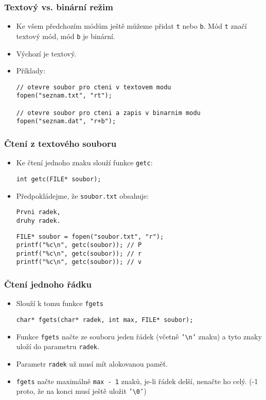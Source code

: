 \documentclass{beamer}
\newenvironment{itemizex}%
  {\large \begin{itemize}%
    \setlength{\itemsep}{8pt}%
    \setlength{\parskip}{8pt}}%
  {\end{itemize}}
\begin{document}
\begin{frame}[t,fragile]\frametitle{Textový vs. binární režim} 
    \begin{itemizex}
        \item Ke všem předchozím módům ještě můžeme přidat \texttt{t} nebo \texttt{b}. Mód \texttt{t} značí textový mód, mód \texttt{b} je binární. 
        \item Výchozí je textový.
        \item Příklady:
\begin{verbatim} 
// otevre soubor pro cteni v textovem modu
fopen("seznam.txt", "rt");

// otevre soubor pro cteni a zapis v binarnim modu
fopen("seznam.dat", "r+b");
\end{verbatim}
    \end{itemizex}
\end{frame}


\begin{frame}[t,fragile]\frametitle{Čtení z textového souboru} 
    \begin{itemizex}
        \item Ke čtení jednoho znaku slouží funkce \texttt{getc}:
\begin{verbatim} 
int getc(FILE* soubor);
\end{verbatim}
        \item Předpokládejme, že \texttt{soubor.txt} obsahuje:
\begin{verbatim} 
Prvni radek,
druhy radek.
\end{verbatim}

\begin{verbatim} 
FILE* soubor = fopen("soubor.txt", "r");
printf("%c\n", getc(soubor)); // P
printf("%c\n", getc(soubor)); // r
printf("%c\n", getc(soubor)); // v
\end{verbatim}
    \end{itemizex}
\end{frame}


\begin{frame}[t,fragile]\frametitle{Čtení jednoho řádku} 
    \begin{itemizex}
        \item Slouží k tomu funkce \texttt{fgets}
\begin{verbatim} 
char* fgets(char* radek, int max, FILE* soubor);
\end{verbatim}
        \item Funkce \texttt{fgets} načte ze souboru jeden řádek (včetně \texttt{'\textbackslash n'} znaku) a tyto znaky uloží do parametru \texttt{radek}. 
        \item Parametr \texttt{radek} už musí mít alokovanou paměť.
        \item \texttt{fgets} načte maximálně \texttt{max - 1} znaků, je-li řádek delší, nenačte ho celý. (-1 proto, že na konci musí ještě uložit \texttt{'\textbackslash0'})
    \end{itemizex}
\end{frame}
\end{document}
